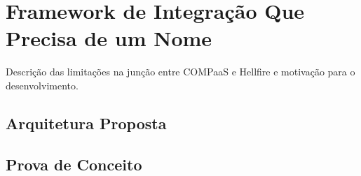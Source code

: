 \section{Framework de Integração Que Precisa de um Nome}
\label{sec:Framework}
Descrição das limitações na junção entre COMPaaS e Hellfire e motivação para o desenvolvimento.

\subsection{Arquitetura Proposta}
\subsection{Prova de Conceito}
